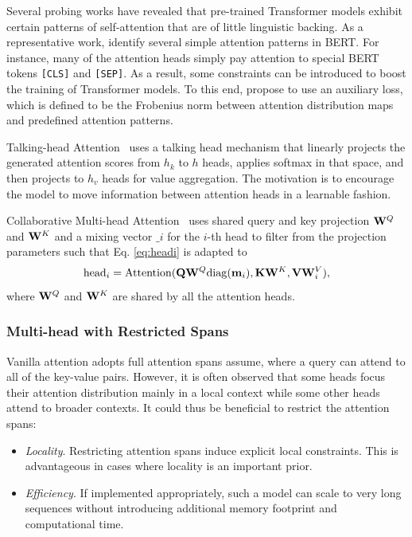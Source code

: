 \documentclass[manuscript,acmsmall,screen,nonacm]{acmart}
\theoremstyle{definition}
\begin{document}
Several probing works have revealed that pre-trained Transformer models exhibit certain patterns of self-attention that are of little linguistic backing. As a representative work, \citet{Kovaleva19bertsecret} identify several simple attention patterns in BERT. For instance, many of the attention heads simply pay attention to special BERT tokens \texttt{[CLS]} and \texttt{[SEP]}. As a result, some constraints can be introduced to boost the training of Transformer models. To this end, \citet{deshpande20guidingattention} propose to use an auxiliary loss, which is defined to be the Frobenius norm between attention distribution maps and predefined attention patterns.

Talking-head Attention~\cite{shazeer20talkinghead} uses a talking head mechanism that linearly projects the generated attention scores from $h_k$ to $h$ heads, applies softmax in that space, and then projects to $h_v$ heads for value aggregation. The motivation is to encourage the model to move information between attention heads in a learnable fashion.

Collaborative Multi-head Attention~\cite{cordonnier20collaborate} uses shared query and key projection $\mathbf{W}^Q$ and $\mathbf{W}^K$ and a mixing vector $\bm_i$ for the $i$-th head to filter from the projection parameters such that Eq. \eqref{eq:headi} is adapted to
\begin{equation}
    \mathrm{head}_i=\mathrm{Attention}(\mathbf{Q}\mathbf{W}^Q\mathrm{diag}(\mathbf{m}_i),\mathbf{K}\mathbf{W}^K, \mathbf{V}\mathbf{W}_i^V),
\end{equation}
where $\mathbf{W}^Q$ and $\mathbf{W}^K$ are shared by all the attention heads.

\subsubsection{Multi-head with Restricted Spans}

Vanilla attention adopts full attention spans assume, where a query can attend to all of the key-value pairs. However, it is often observed that some heads focus their attention distribution mainly in a local context while some other heads attend to broader contexts. It could thus be beneficial to restrict the attention spans:
\begin{itemize}
    \item \textit{Locality}. Restricting attention spans induce explicit local constraints. This is advantageous in cases where locality is an important prior.
    \item \textit{Efficiency}. If implemented appropriately, such a model can scale to very long sequences without introducing additional memory footprint and computational time.
\end{itemize}
\end{document}
